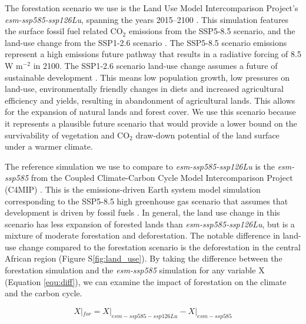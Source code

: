 \documentclass[]{article}
\begin{document}
The forestation scenario we use is the Land Use Model Intercomparison Project's \textit{esm-ssp585-ssp126Lu}, spanning the years 2015--2100 \parencite{lawrence_land_2016}.
This simulation features the surface fossil fuel related CO$_{2}$ emissions from the SSP5-8.5 scenario, and the land-use change from the SSP1-2.6 scenario \parencite{oneill_scenario_2016}.
The SSP5-8.5 scenario emissions represent a high emissions future pathway that results in a radiative forcing of 8.5 W m$^{-2}$ in 2100.
The SSP1-2.6 scenario land-use change assumes a future of sustainable development \parencite{van_vuuren_energy_2017}.
This means low population growth, low pressures on land-use, environmentally friendly changes in diets and increased agricultural efficiency and yields, resulting in abandonment of agricultural lands.
This allows for the expansion of natural lands and forest cover.
We use this scenario because it represents a plausible future scenario that would provide a lower bound on the survivability of vegetation and CO$_2$ draw-down potential of the land surface under a warmer climate.

The reference simulation we use to compare to \textit{esm-ssp585-ssp126Lu} is the \textit{esm-ssp585} from the Coupled Climate-Carbon Cycle Model Intercomparison Project (C4MIP) \parencite{jones_c4mip_2016}.
This is the emissions-driven Earth system model simulation corresponding to the SSP5-8.5 high greenhouse gas scenario that assumes that development is driven by fossil fuels \parencite{oneill_scenario_2016}.
In general, the land use change in this scenario has less expansion of forested lands than \textit{esm-ssp585-ssp126Lu}, but is a mixture of moderate forestation and deforestation.
The notable difference in land-use change compared to the forestation scenario is the deforestation in the central African region (Figure S\ref{fig:land_use}).
By taking the difference between the forestation simulation and the \textit{esm-ssp585} simulation for any variable X (Equation \ref{equ:diff}), we can examine the impact of forestation on the climate and the carbon cycle.

\begin{equation}
    X|_{for} = X|_{esm-ssp585-ssp126Lu} - X|_{esm-ssp585}
    \label{equ:diff}
\end{equation}
\end{document}
